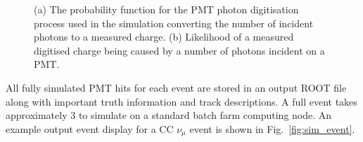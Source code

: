 \begin{figure} %
    \centering
    \quad
    \caption[Detector simulation PMT digitisation function]
    {(a) The probability function for the PMT photon digitisation process used in the simulation
        converting the number of incident photons to a measured charge. (b) Likelihood of a
        measured digitised charge being caused by a number of photons incident on a PMT.}
    \label{fig:digitisation}
\end{figure}

All fully simulated PMT hits for each event are stored in an output ROOT file along with important
truth information and track descriptions. A full event takes approximately
\unit{3}{} to simulate on a standard batch farm computing node. An example output
event display for a CC $\nu_{\mu}$ event is shown in Fig.~\ref{fig:sim_event}.

